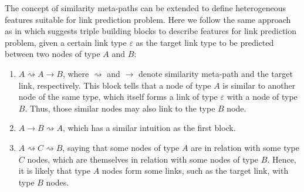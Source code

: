 The concept of similarity meta-paths can be extended to define heterogeneous features suitable for link prediction problem. Here we follow the same approach as in \cite{sun2012will} which suggests triple building blocks to describe features for link prediction problem, given a certain link type $\varepsilon$ as the target link type to be predicted between two nodes of type $A$ and $B$: 
\begin{enumerate}
	\small
	\item $A\rightsquigarrow A\rightarrow B$, where $\rightsquigarrow$ and $\rightarrow$ denote similarity meta-path and the target link, respectively. This block tells that a node of type $A$ is similar to another node of the same type, which itself forms a link of type $\varepsilon$ with a node of type $B$. Thus, those similar nodes may also link to the type $B$ node.
	\item $A\rightarrow B \rightsquigarrow A$, which has a similar intuition as the first block.
	\item $A\rightsquigarrow C \rightsquigarrow B$, saying that some nodes of type $A$ are in relation with some type $C$ nodes, which are themselves in relation with some nodes of type $B$. Hence, it is likely that type $A$ nodes form some links, such as the target link, with type $B$ nodes.
\end{enumerate}


